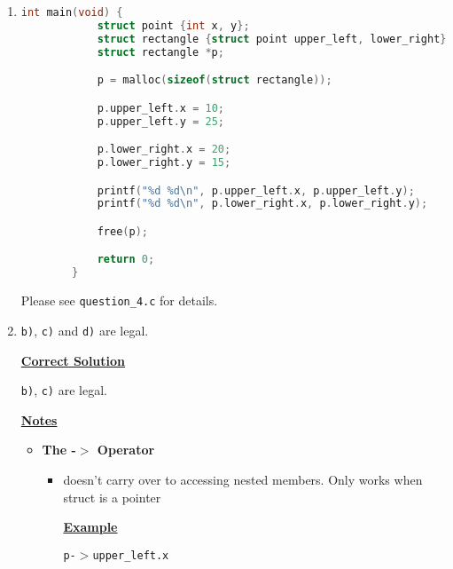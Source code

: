 \documentclass[12pt]{article}
\begin{document}
\begin{enumerate}[1.]
    \item


    \begin{lstlisting}[language=c]
        int main(void) {
            struct point {int x, y};
            struct rectangle {struct point upper_left, lower_right};
            struct rectangle *p;

            p = malloc(sizeof(struct rectangle));

            p.upper_left.x = 10;
            p.upper_left.y = 25;

            p.lower_right.x = 20;
            p.lower_right.y = 15;

            printf("%d %d\n", p.upper_left.x, p.upper_left.y);
            printf("%d %d\n", p.lower_right.x, p.lower_right.y);

            free(p);

            return 0;
        }

    \end{lstlisting}


    Please see \texttt{question\_4.c} for details.

    \item

    \texttt{b)}, \texttt{c)} and \texttt{d)} are legal.

    \bigskip

    \begin{mdframed}
    \underline{\textbf{Correct Solution}}

    \bigskip

    \texttt{b)}, \texttt{c)} are legal.
    \end{mdframed}

    \bigskip

    \underline{\textbf{Notes}}

    \begin{itemize}
        \item \textbf{The -$>$ Operator}
        \begin{itemize}
            \item doesn't carry over to accessing nested members. Only works when
            struct is a pointer

            \bigskip

            \underline{\textbf{Example}}

            \bigskip

            \texttt{p-$>$upper\_left.x}
        \end{itemize}
    \end{itemize}


\end{enumerate}
\end{document}
